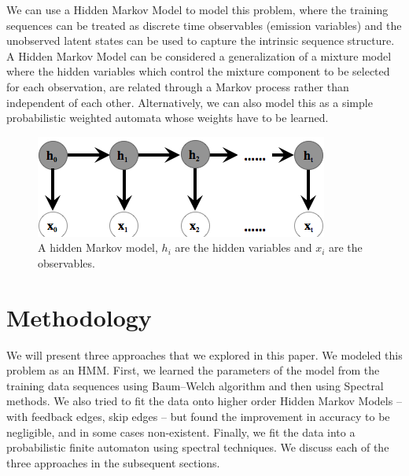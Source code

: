 \documentclass[letterpaper]{article}
\begin{document}
We can use a Hidden Markov Model to model this problem, where the training sequences can be treated as discrete time observables (emission variables) and the unobserved latent states can be used to capture the intrinsic sequence structure. A Hidden Markov Model can be considered a generalization of a mixture model where the hidden variables which control the mixture component to be selected for each observation, are related through a Markov process rather than independent of each other. Alternatively, we can also model this as a simple probabilistic weighted automata whose weights have to be learned. 

\begin{figure}[h]
	\includegraphics[scale=0.6]{"nhmm"}
	\caption{A hidden Markov model, $h_{i}$ are the hidden variables and $x_{i}$ are the observables.}
\end{figure}

\section{Methodology}
We will present three approaches that we explored in this paper. We modeled this problem as an HMM. First, we learned the parameters of the model from the training data sequences using Baum–Welch algorithm and then using Spectral methods. We also tried to fit the data onto higher order Hidden Markov Models -- with feedback edges, skip edges -- but found the improvement in accuracy to be negligible, and in some cases non-existent. Finally, we fit the data into a probabilistic finite automaton using spectral techniques.  We discuss each of the three approaches in the subsequent sections.
\end{document}
